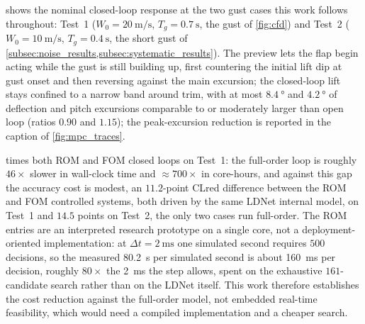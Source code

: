  shows the nominal closed-loop response at the two gust cases this work
follows throughout: Test~1 ($W_0 = \SI{20}{\meter\per\second}$, $T_g = \SI{0.7}{\second}$, the gust
of \cref{fig:cfd}) and Test~2 ($W_0 = \SI{10}{\meter\per\second}$, $T_g = \SI{0.4}{\second}$, the
short gust of \cref{subsec:noise_results,subsec:systematic_results}). The preview lets the flap
begin acting while the gust is still building up, first countering the initial lift dip at gust
onset and then reversing against the main excursion; the closed-loop lift stays confined to a
narrow band around trim, with at most $\SI{8.4}{\degree}$ and $\SI{4.2}{\degree}$ of deflection
and pitch excursions comparable to or moderately larger than open loop (ratios $0.90$ and
$1.15$); the peak-excursion reduction is reported in the caption of \cref{fig:mpc_traces}.


 times both ROM and FOM closed loops on Test~1: the full-order loop
is roughly $46\times$ slower in wall-clock time and $\approx700\times$ in core-hours, and against
this gap the accuracy cost is modest, an $11.2$-point CLred difference between the ROM and FOM
controlled systems, both driven by the same LDNet internal model, on Test~1 and $14.5$ points
on Test~2, the only two cases run full-order. The ROM
entries are an interpreted research prototype on a single core, not a deployment-oriented
implementation: at $\Delta t = \SI{2}{\milli\second}$ one simulated second requires $500$
decisions, so the measured \SI{80.2}{\second} per simulated second is about \SI{160}{\milli\second}
per decision, roughly $80\times$ the \SI{2}{\milli\second} the step allows, spent on the exhaustive
$161$-candidate search rather than
on the LDNet itself. This work therefore establishes the cost reduction against the full-order
model, not embedded real-time feasibility, which would need a compiled implementation and a
cheaper search.


